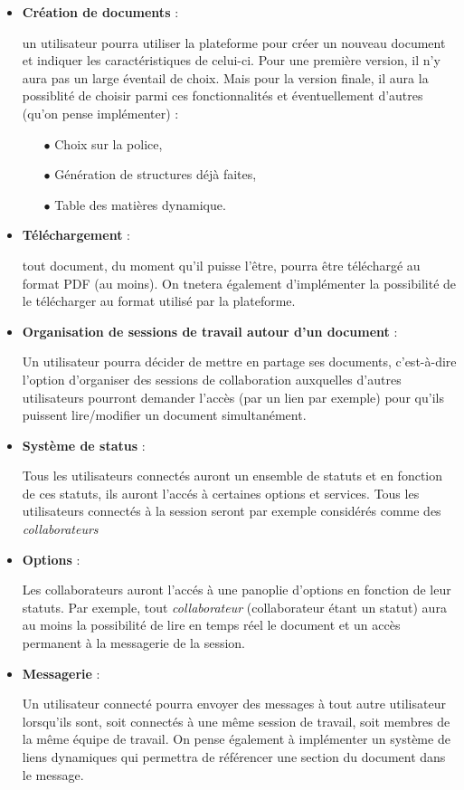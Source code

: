 	\begin{itemize}
		\item \textbf{Création de documents} : \par un utilisateur pourra utiliser la plateforme pour créer un nouveau document et indiquer les caractéristiques de celui-ci. Pour une première version, il n'y aura pas un large éventail de choix. Mais pour la version finale, il aura la possiblité de choisir parmi ces fonctionnalités et éventuellement d'autres (qu'on pense implémenter) : \par 
		\begin{itemize}
			\item[$\bullet$] Choix sur la police,
			\item[$\bullet$] Génération de structures déjà faites,
			\item[$\bullet$] Table des matières dynamique.
		\end{itemize}
		
		\item \textbf{Téléchargement} : \par tout document, du moment qu'il puisse l'être, pourra être téléchargé au format PDF (au moins). On tnetera également d'implémenter la possibilité de le télécharger au format utilisé par la plateforme.
		
		\item \textbf{Organisation de sessions de travail autour d'un document} : \par Un utilisateur pourra décider de mettre en partage ses documents, c'est-à-dire l'option d'organiser des sessions de collaboration auxquelles d'autres utilisateurs pourront demander l'accès (par un lien par exemple) pour qu'ils puissent lire/modifier un document simultanément.
		
		\item \textbf{Système de status} : \par Tous les utilisateurs connectés auront un ensemble de statuts et en fonction de ces statuts, ils auront l'accés à certaines options et services. Tous les utilisateurs connectés à la session seront par exemple considérés comme des \emph{collaborateurs}
		
		\item \textbf{Options} : \par 
		Les collaborateurs auront l'accés à une panoplie d'options en fonction de leur statuts. Par exemple, tout \emph{collaborateur} (collaborateur étant un statut) aura au moins la possibilité de lire en temps réel le document et un accès permanent à la messagerie de la session.
		
		\item \textbf{Messagerie} : \par 
		Un utilisateur connecté pourra envoyer des messages à tout autre utilisateur lorsqu'ils sont, soit connectés à une même session de travail, soit membres de la même équipe de travail. On pense également à implémenter un système de liens dynamiques qui permettra de référencer une section du document dans le message.

	\end{itemize}
	
